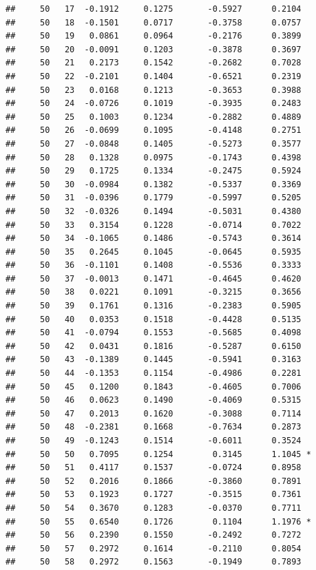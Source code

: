 \documentclass[
]{article}
\begin{document}
\begin{verbatim}
##     50   17  -0.1912     0.1275       -0.5927      0.2104  
##     50   18  -0.1501     0.0717       -0.3758      0.0757  
##     50   19   0.0861     0.0964       -0.2176      0.3899  
##     50   20  -0.0091     0.1203       -0.3878      0.3697  
##     50   21   0.2173     0.1542       -0.2682      0.7028  
##     50   22  -0.2101     0.1404       -0.6521      0.2319  
##     50   23   0.0168     0.1213       -0.3653      0.3988  
##     50   24  -0.0726     0.1019       -0.3935      0.2483  
##     50   25   0.1003     0.1234       -0.2882      0.4889  
##     50   26  -0.0699     0.1095       -0.4148      0.2751  
##     50   27  -0.0848     0.1405       -0.5273      0.3577  
##     50   28   0.1328     0.0975       -0.1743      0.4398  
##     50   29   0.1725     0.1334       -0.2475      0.5924  
##     50   30  -0.0984     0.1382       -0.5337      0.3369  
##     50   31  -0.0396     0.1779       -0.5997      0.5205  
##     50   32  -0.0326     0.1494       -0.5031      0.4380  
##     50   33   0.3154     0.1228       -0.0714      0.7022  
##     50   34  -0.1065     0.1486       -0.5743      0.3614  
##     50   35   0.2645     0.1045       -0.0645      0.5935  
##     50   36  -0.1101     0.1408       -0.5536      0.3333  
##     50   37  -0.0013     0.1471       -0.4645      0.4620  
##     50   38   0.0221     0.1091       -0.3215      0.3656  
##     50   39   0.1761     0.1316       -0.2383      0.5905  
##     50   40   0.0353     0.1518       -0.4428      0.5135  
##     50   41  -0.0794     0.1553       -0.5685      0.4098  
##     50   42   0.0431     0.1816       -0.5287      0.6150  
##     50   43  -0.1389     0.1445       -0.5941      0.3163  
##     50   44  -0.1353     0.1154       -0.4986      0.2281  
##     50   45   0.1200     0.1843       -0.4605      0.7006  
##     50   46   0.0623     0.1490       -0.4069      0.5315  
##     50   47   0.2013     0.1620       -0.3088      0.7114  
##     50   48  -0.2381     0.1668       -0.7634      0.2873  
##     50   49  -0.1243     0.1514       -0.6011      0.3524  
##     50   50   0.7095     0.1254        0.3145      1.1045 *
##     50   51   0.4117     0.1537       -0.0724      0.8958  
##     50   52   0.2016     0.1866       -0.3860      0.7891  
##     50   53   0.1923     0.1727       -0.3515      0.7361  
##     50   54   0.3670     0.1283       -0.0370      0.7711  
##     50   55   0.6540     0.1726        0.1104      1.1976 *
##     50   56   0.2390     0.1550       -0.2492      0.7272  
##     50   57   0.2972     0.1614       -0.2110      0.8054  
##     50   58   0.2972     0.1563       -0.1949      0.7893  

\end{verbatim}
\end{document}
